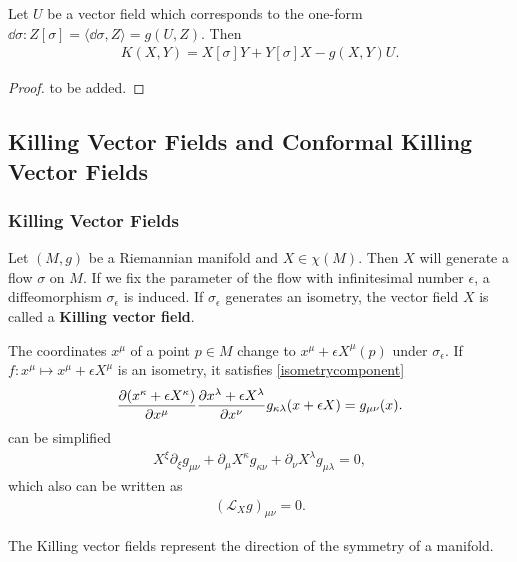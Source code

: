 \documentclass[10pt]{article}
\begin{document}
\begin{proposition}
    Let $U$ be a vector field which corresponds to the one-form $\dd{\sigma}:Z[\sigma]=\langle\dd{\sigma},Z\rangle=g(U,Z)$.
    Then
    \begin{align}
        K(X,Y)=X[\sigma]Y+Y[\sigma]X-g(X,Y)U.
    \end{align}
\end{proposition}
\begin{proof}
    to be added.
\end{proof}

\subsection{Killing Vector Fields and Conformal Killing Vector Fields}
\subsubsection{Killing Vector Fields}
\begin{definition}
    Let $(M,g)$ be a Riemannian manifold and $X\in\chi(M)$.
    Then $X$ will generate a flow $\sigma$ on $M$.
    If we fix the parameter of the flow with infinitesimal number $\epsilon$, a diffeomorphism $\sigma_\epsilon$ is induced.
    If $\sigma_\epsilon$ generates an isometry, the vector field $X$ is called a \textbf{Killing vector field}.
\end{definition}
The coordinates $x^\mu$ of a point $p\in M$ change to $x^\mu+\epsilon X^\mu(p)$ under $\sigma_\epsilon$.
If $f:x^\mu\mapsto x^\mu+\epsilon X^\mu$ is an isometry, it satisfies \cref{isometrycomponent}
\begin{align}
    \pdv{(x^\kappa+\epsilon X^\kappa)}{x^\mu}\pdv{x^\lambda+\epsilon X^\lambda}{x^\nu}g_{\kappa\lambda}(x+\epsilon X)=g_{\mu\nu}(x).\label{killingcomponent1}
\end{align}
 can be simplified
\begin{align}
    X^\xi\partial_\xi g_{\mu\nu}+\partial_\mu X^\kappa g_{\kappa\nu}+\partial_\nu X^\lambda g_{\mu\lambda}=0,
\end{align}
which also can be written as
\begin{align}
    (\mathcal{L}_X g)_{\mu\nu}=0.
\end{align}
\begin{remark}
    The Killing vector fields represent the direction of the symmetry of a manifold.
\end{remark}
\end{document}
